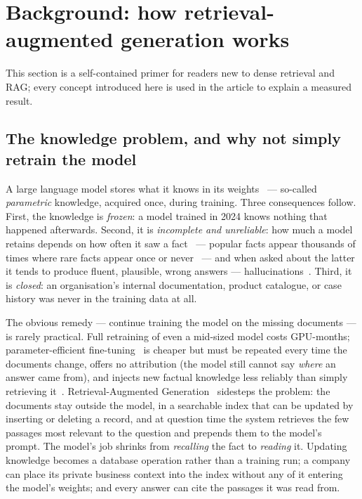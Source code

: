 \section{Background: how retrieval-augmented generation works}
\label{sec:primer}

This section is a self-contained primer for readers new to dense retrieval
and RAG; every concept introduced here is used in the article to explain a
measured result.

\subsection{The knowledge problem, and why not simply retrain the model}
\label{sec:why-rag}

A large language model stores what it knows in its
weights~\citep{brown2020gpt3,petroni2019lmkb} --- so-called
\emph{parametric} knowledge, acquired once, during training. Three
consequences follow. First, the knowledge is \emph{frozen}: a model trained
in 2024 knows nothing that happened afterwards. Second, it is
\emph{incomplete and unreliable}: how much a model retains depends on how
often it saw a fact~\citep{roberts2020knowledge,kandpal2023longtail} ---
popular facts appear thousands of times where rare facts appear once or
never~\citep{mallen2023popqa} --- and when asked about the latter it tends
to produce fluent, plausible, wrong answers ---
hallucinations~\citep{ji2023hallucination,zhang2023sirens}. Third, it is
\emph{closed}: an
organisation's internal documentation, product catalogue, or case history
was never in the training data at all.

The obvious remedy --- continue training the model on the missing documents
--- is rarely practical. Full retraining of even a mid-sized model costs
GPU-months; parameter-efficient fine-tuning~\citep{hu2022lora} is cheaper
but must be repeated every time the documents change, offers no
attribution (the model still cannot say \emph{where} an answer came
from), and injects new factual knowledge less reliably than simply
retrieving it~\citep{ovadia2024finetuning}. Retrieval-Augmented
Generation~\citep{lewis2020rag} sidesteps the problem: the documents stay
outside the model, in a searchable index that can be updated by inserting
or deleting a record, and at question time the system retrieves the few
passages most relevant to the question and prepends them to the model's
prompt. The model's job shrinks from \emph{recalling} the fact to
\emph{reading} it. Updating knowledge becomes a database operation rather than
a training run; a company can place its private business context into the
index without any of it entering the model's weights; and every answer can
cite the passages it was read from.

